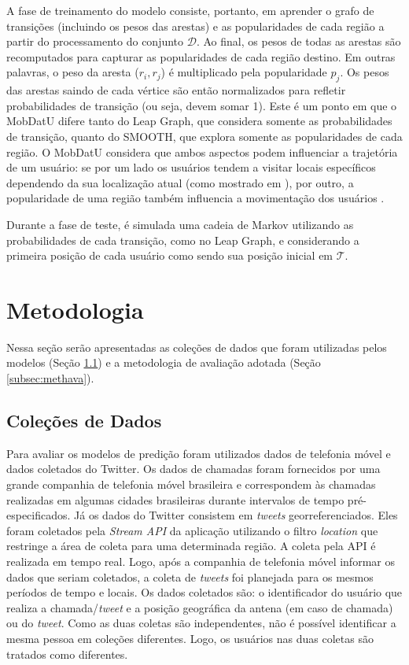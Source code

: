 \documentclass[10pt, a4paper, onecolumn, conference, compsocconf]{IEEEtran}
\begin{document}
A fase de treinamento do modelo consiste, portanto, em aprender o grafo de transições  (incluindo os pesos das arestas) e as popularidades de cada região a partir do processamento do conjunto $\mathcal{D}$. Ao final, os pesos de todas as  arestas são recomputados para capturar as popularidades de cada região destino. Em outras palavras, o peso da aresta ($r_i, r_j$) é multiplicado pela popularidade $p_j$. Os pesos  das arestas saindo de cada vértice são então normalizados para refletir probabilidades de  transição (ou seja, devem somar 1).  Este é um ponto em que o MobDatU difere tanto do Leap Graph, que considera somente as probabilidades de transição, quanto do SMOOTH, que explora somente as popularidades de cada região.  O MobDatU considera que ambos aspectos podem influenciar a trajetória de um usuário:  
se por um lado os usuários tendem a visitar locais específicos dependendo da sua localização atual (como mostrado em \cite{Dong2013}), por outro,  a popularidade de uma região também influencia a movimentação dos usuários \cite{Munjal2011, noulas2011}. 


Durante a fase de teste,  é simulada uma cadeia de Markov utilizando as probabilidades de cada transição, como no Leap Graph, e considerando a primeira posição de cada usuário como sendo sua posição inicial em $\mathcal{T}$. 
     

  
\section{Metodologia} \label{sec:meth}

Nessa seção serão apresentadas as coleções de dados que foram utilizadas pelos modelos (Seção \ref{sec:dados}) e a metodologia de avaliação adotada (Seção \ref{subsec:methava}).

\subsection{Coleções de Dados}\label{sec:dados}


Para avaliar os modelos de predição foram utilizados dados de telefonia móvel e dados coletados do Twitter. Os dados de chamadas foram fornecidos por uma grande companhia de telefonia móvel brasileira e correspondem às chamadas realizadas em algumas cidades brasileiras durante intervalos de tempo pré-especificados.  Já os dados do Twitter consistem em {\it tweets} georreferenciados. Eles foram coletados pela {\it Stream API} da aplicação \cite{twitterapi} utilizando o filtro \textit{location} que restringe a área de coleta para uma determinada região. A coleta pela API é realizada em tempo real. Logo,  após a companhia de telefonia móvel informar os dados que seriam coletados, a coleta de {\it tweets} foi planejada para os mesmos períodos de tempo e locais. Os dados coletados são: o identificador do usuário que realiza a chamada/\textit{tweet} e a posição geográfica da antena (em caso de chamada) ou do \textit{tweet}. Como as duas coletas são independentes, não é possível identificar a mesma pessoa em coleções diferentes. Logo, os usuários nas duas coletas são tratados como diferentes.
\end{document}
